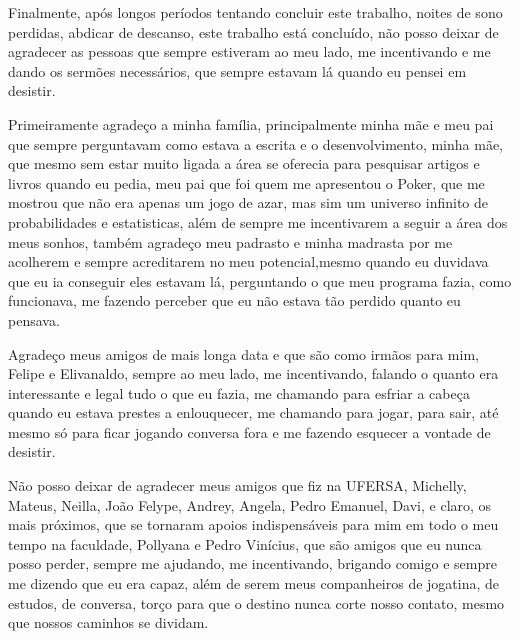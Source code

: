 
Finalmente, após longos períodos tentando concluir este trabalho, noites de sono perdidas, abdicar de descanso, este trabalho está concluído, não posso deixar de agradecer as pessoas que sempre estiveram ao meu lado, me incentivando e me dando os sermões necessários, que sempre estavam lá quando eu pensei em desistir.

Primeiramente agradeço a minha família, principalmente minha mãe e meu pai que sempre perguntavam como estava a escrita e o desenvolvimento, minha mãe, que mesmo sem estar muito ligada a área se oferecia para pesquisar artigos e livros quando eu pedia, meu pai que foi quem me apresentou o Poker, que me mostrou que não era apenas um jogo de azar, mas sim um universo infinito de probabilidades e estatisticas, além de sempre me incentivarem a seguir a área dos meus sonhos, também agradeço meu padrasto e minha madrasta por me acolherem e sempre acreditarem no meu potencial,mesmo quando eu duvidava que eu ia conseguir eles estavam lá, perguntando o que meu programa fazia, como funcionava, me fazendo perceber que eu não estava tão perdido quanto eu pensava.

Agradeço meus amigos de mais longa data e que são como irmãos para mim, Felipe e Elivanaldo, sempre ao meu lado, me incentivando, falando o quanto era interessante e legal tudo o que eu fazia, me chamando para esfriar a cabeça quando eu estava prestes a enlouquecer, me chamando para jogar, para sair, até mesmo só para ficar jogando conversa fora e me fazendo esquecer a vontade de desistir.

Não posso deixar de agradecer meus amigos que fiz na UFERSA, Michelly, Mateus, Neilla, João Felype, Andrey, Angela, Pedro Emanuel, Davi, e claro, os mais próximos, que se tornaram apoios indispensáveis para mim em todo o meu tempo na faculdade, Pollyana e Pedro Vinícius, que são amigos que eu nunca posso perder, sempre me ajudando, me incentivando, brigando comigo e sempre me dizendo que eu era capaz, além de serem meus companheiros de jogatina, de estudos, de conversa, torço para que o destino nunca corte nosso contato, mesmo que nossos caminhos se dividam.